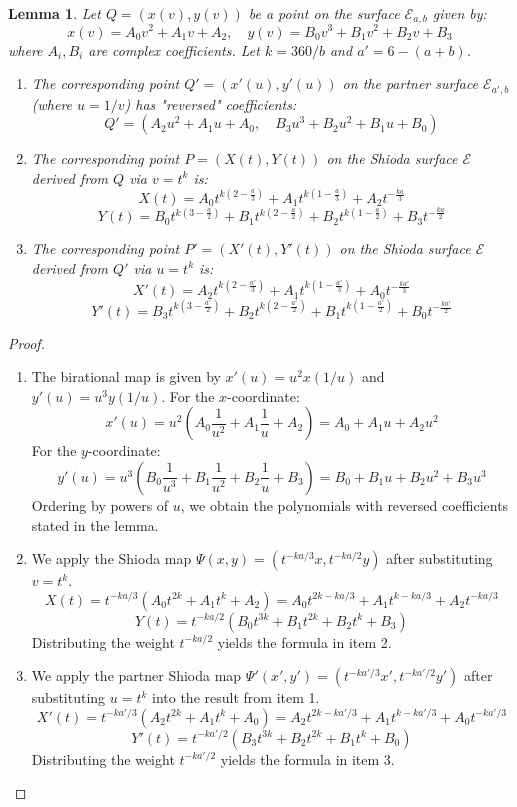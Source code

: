 \documentclass[11pt]{amsart}
\newcommand{\Ee}{{\mathcal E}}
\newtheorem{lema}[thm]{Lemma}
\numberwithin{equation}{section}
\numberwithin{table}{section}
\newcommand\<{\langle}
\begin{document}
\begin{lema}
	\label{lem:cubic_transform}
	Let $Q = (x(v), y(v))$ be a point on the surface $\Ee_{a,b}$ given by:
	\[ x(v) = A_0 v^2 + A_1 v + A_2, \quad y(v) = B_0 v^3 + B_1 v^2 + B_2 v + B_3 \]
	where $A_i, B_i$ are complex coefficients. Let $k = 360/b$ and $a' = 6-(a+b)$.
	
	\begin{enumerate}
		\item [(i)] The corresponding point $Q'=(x'(u), y'(u))$ on the partner surface $\Ee_{a', b}$ (where $u=1/v$) has "reversed" coefficients:
		\[ Q' = (A_2 u^2 + A_1 u + A_0, \quad B_3 u^3 + B_2 u^2 + B_1 u + B_0) \]
		
		\item [(ii)] The corresponding point $P=(X(t), Y(t))$ on the Shioda surface $\Ee$ derived from $Q$ via $v=t^k$ is:
		\[ X(t) = A_0 t^{k(2 - \frac{a}{3})} + A_1 t^{k(1 - \frac{a}{3})} + A_2 t^{-\frac{ka}{3}} \]
		\[ Y(t) = B_0 t^{k(3 - \frac{a}{2})} + B_1 t^{k(2 - \frac{a}{2})} + B_2 t^{k(1 - \frac{a}{2})} + B_3 t^{-\frac{ka}{2}} \]
		
		\item [(iii)] The corresponding point $P'=(X'(t), Y'(t))$ on the Shioda surface $\Ee$ derived from $Q'$ via $u=t^k$ is:
		\[ X'(t) = A_2 t^{k(2 - \frac{a'}{3})} + A_1 t^{k(1 - \frac{a'}{3})} + A_0 t^{-\frac{ka'}{3}} \]
		\[ Y'(t) = B_3 t^{k(3 - \frac{a'}{2})} + B_2 t^{k(2 - \frac{a'}{2})} + B_1 t^{k(1 - \frac{a'}{2})} + B_0 t^{-\frac{ka'}{2}} \]
	\end{enumerate}
\end{lema}

\begin{proof}
	\begin{enumerate}
	\item [(i)] The birational map is given by $x'(u) = u^2 x(1/u)$ and $y'(u) = u^3 y(1/u)$. 
	For the $x$-coordinate:
	\[ x'(u) = u^2 \left( A_0 \frac{1}{u^2} + A_1 \frac{1}{u} + A_2 \right) = A_0 + A_1 u + A_2 u^2 \]
	For the $y$-coordinate:
	\[ y'(u) = u^3 \left( B_0 \frac{1}{u^3} + B_1 \frac{1}{u^2} + B_2 \frac{1}{u} + B_3 \right) = B_0 + B_1 u + B_2 u^2 + B_3 u^3 \]
	Ordering by powers of $u$, we obtain the polynomials with reversed coefficients stated in the lemma.
	
\item [(ii)] We apply the Shioda map $\Psi(x,y) = (t^{-ka/3}x, t^{-ka/2}y)$ after substituting $v=t^k$.
	\[ X(t) = t^{-ka/3}(A_0 t^{2k} + A_1 t^k + A_2) = A_0 t^{2k-ka/3} + A_1 t^{k-ka/3} + A_2 t^{-ka/3} \]
	\[ Y(t) = t^{-ka/2}(B_0 t^{3k} + B_1 t^{2k} + B_2 t^k + B_3) \]
	Distributing the weight $t^{-ka/2}$ yields the formula in item 2.
	
\item [(ii)] We apply the partner Shioda map $\Psi'(x',y') = (t^{-ka'/3}x', t^{-ka'/2}y')$ after substituting $u=t^k$ into the result from item 1.
	\[ X'(t) = t^{-ka'/3}(A_2 t^{2k} + A_1 t^k + A_0) = A_2 t^{2k-ka'/3} + A_1 t^{k-ka'/3} + A_0 t^{-ka'/3} \]
	\[ Y'(t) = t^{-ka'/2}(B_3 t^{3k} + B_2 t^{2k} + B_1 t^k + B_0) \]
	Distributing the weight $t^{-ka'/2}$ yields the formula in item 3.
	\end{enumerate}
\end{proof}
\end{document}
